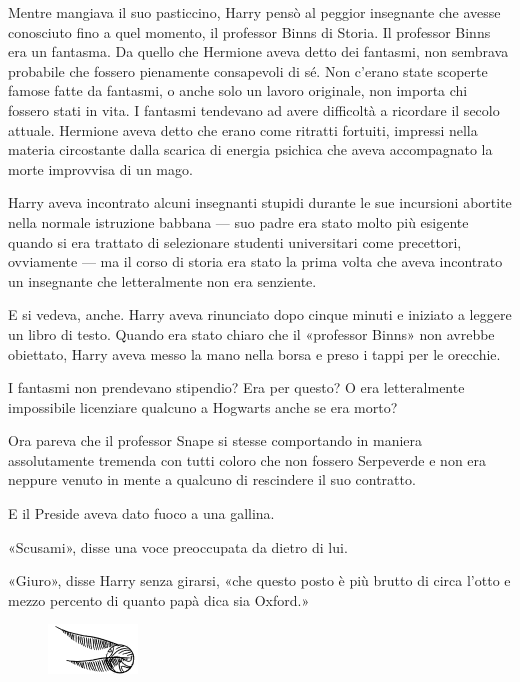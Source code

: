 Mentre mangiava il suo pasticcino, Harry pensò al peggior insegnante che avesse conosciuto fino a quel momento, il professor Binns di Storia. Il professor Binns era un fantasma. Da quello che Hermione aveva detto dei fantasmi, non sembrava probabile che fossero pienamente consapevoli di sé. Non c’erano state scoperte famose fatte da fantasmi, o anche solo un lavoro originale, non importa chi fossero stati in vita. I fantasmi tendevano ad avere difficoltà a ricordare il secolo attuale. Hermione aveva detto che erano come ritratti fortuiti, impressi nella materia circostante dalla scarica di energia psichica che aveva accompagnato la morte improvvisa di un mago.

Harry aveva incontrato alcuni insegnanti stupidi durante le sue incursioni abortite nella normale istruzione babbana — suo padre era stato molto più esigente quando si era trattato di selezionare studenti universitari come precettori, ovviamente — ma il corso di storia era stato la prima volta che aveva incontrato un insegnante che letteralmente non era senziente.

E si vedeva, anche. Harry aveva rinunciato dopo cinque minuti e iniziato a leggere un libro di testo. Quando era stato chiaro che il «professor Binns» non avrebbe obiettato, Harry aveva messo la mano nella borsa e preso i tappi per le orecchie.

I fantasmi non prendevano stipendio? Era per questo? O era letteralmente impossibile licenziare qualcuno a Hogwarts anche se era morto?

Ora pareva che il professor Snape si stesse comportando in maniera assolutamente tremenda con tutti coloro che non fossero Serpeverde e non era neppure venuto in mente a qualcuno di rescindere il suo contratto.

E il Preside aveva dato fuoco a una gallina.

«Scusami», disse una voce preoccupata da dietro di lui.

«Giuro», disse Harry senza girarsi, «che questo posto è più brutto di circa l’otto e mezzo percento di quanto papà dica sia Oxford.»

\begin{figure}[h!]
        \includegraphics[scale=0.4]{boccino.png}
        \centering
\end{figure}

